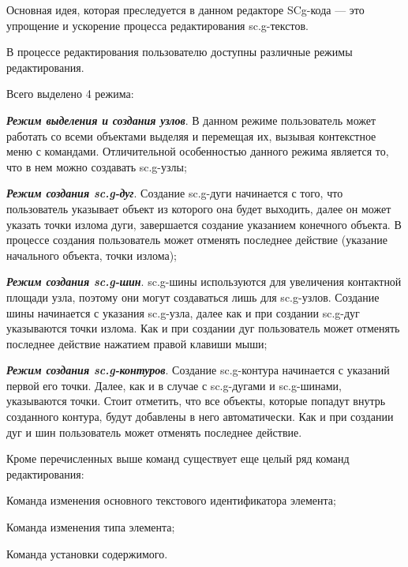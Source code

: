 Основная идея, которая преследуется в данном редакторе SCg-кода --- это упрощение и ускорение процесса редактирования sc.g-текстов.

В процессе редактирования пользователю доступны различные режимы редактирования.

Всего выделено 4 режима:
\begin{textitemize}
\item \textbf{\textit{Режим выделения и создания узлов}}.
В данном режиме пользователь может работать со всеми объектами выделяя и перемещая их, вызывая контекстное меню с командами.
Отличительной особенностью данного режима является то, что в нем можно создавать sc.g-узлы;

\item \textbf{\textit{Режим создания sc.g-дуг}}.
Создание sc.g-дуги начинается с того, что пользователь указывает объект из которого она будет выходить, далее он может указать точки излома дуги, завершается создание указанием конечного объекта.
В процессе создания пользователь может отменять последнее действие (указание начального объекта, точки излома);

\item \textbf{\textit{Режим создания sc.g-шин}}.
sc.g-шины используются для увеличения контактной площади узла, поэтому они могут создаваться лишь для sc.g-узлов. 
Создание шины начинается с указания sc.g-узла, далее как и при создании sc.g-дуг указываются точки излома. 
Как и при создании дуг пользователь может отменять последнее действие нажатием правой клавиши мыши;

\item \textbf{\textit{Режим создания sc.g-контуров}}.
Создание sc.g-контура начинается с указаний первой его точки. Далее, как и в случае с sc.g-дугами и sc.g-шинами, указываются точки.
Стоит отметить, что все объекты, которые попадут внутрь созданного
контура, будут добавлены в него автоматически.
Как и при создании дуг и шин пользователь может отменять последнее действие.
\end{textitemize}

Кроме перечисленных выше команд существует еще целый ряд команд редактирования:
\begin{textitemize}
\item Команда изменения основного текстового идентификатора элемента;
\item Команда изменения типа элемента;
\item Команда установки содержимого.
\end{textitemize}

